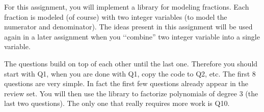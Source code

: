 
For this assignment, you will implement a library for
modeling fractions.
Each fraction is modeled (of course) with two integer variables
(to model the numerator and denominator).
The ideas present in this assignment will be used again in a later assignment
when you \lq\lq combine'' two integer variable into a single variable.

The questions build on top of each other until the last one.
Therefore you should start with Q1, when you are done with Q1, copy the code to Q2, etc.
The first 8 questions are very simple.
In fact the first few questions already appear in the review set.
You will then use the library to factorize polynomials of degree 3 (the last two questions).
The only one that really requires more work is Q10.
